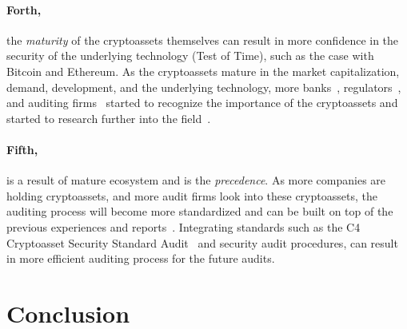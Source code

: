 \paragraph{Forth,} the \textit{maturity} of the cryptoassets themselves can result in more confidence in the security of the underlying technology (Test of Time), such as the case with Bitcoin and Ethereum. As the cryptoassets mature in the market capitalization, demand, development, and the underlying technology, more banks~\cite{azar2022financial,bankofenglandmaturity}, regulators~\cite{govofcanadamaturity,treasury2023future}, and auditing firms~\cite{kpmgadoption} started to recognize the importance of the cryptoassets and started to research further into the field~\cite{basel2021prudential,drozdz2023mature}. 


\paragraph{Fifth,} is a result of mature ecosystem and is the \textit{precedence}. As more companies are holding cryptoassets, and more audit firms look into these cryptoassets, the auditing process will become more standardized and can be built on top of the previous experiences and reports~\cite{cpabauditingcrypto,han2023accounting}. Integrating standards such as the C4 Cryptoasset Security Standard Audit~\cite{c4ccssa} and security audit procedures, can result in more efficient auditing process for the future audits.








\section{Conclusion} \label{sec:auditing:conclusion}


